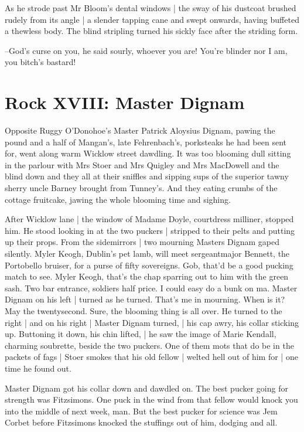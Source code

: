 As he strode past Mr Bloom's dental windows |
the sway of his dustcoat brushed rudely from its angle |
a slender tapping cane and swept onwards,
having buffeted a thewless body.
The blind stripling turned his sickly face after the striding form.

--God's curse on you,
he said sourly,
whoever you are!
You're blinder nor I am,
you bitch's bastard!


\section*{Rock XVIII: Master Dignam}


Opposite Ruggy O'Donohoe's
Master Patrick Aloysius Dignam,
pawing the pound and a half of Mangan's,
late Fehrenbach's,
porksteaks he
had been sent for,
went along warm Wicklow street dawdling.
It was too
blooming dull sitting in the parlour
with Mrs Stoer and Mrs Quigley and
Mrs MacDowell
and the blind down
and they all at their sniffles
and
sipping sups of the superior tawny sherry
uncle Barney brought from
Tunney's.
And they eating crumbs of the cottage fruitcake,
jawing the
whole blooming time and sighing.

After Wicklow lane |
the window of Madame Doyle, courtdress milliner,
stopped him.
He stood looking in at the two puckers |
stripped to their pelts and putting up their props.
From the sidemirrors |
two mourning Masters Dignam gaped silently.
Myler Keogh, Dublin's pet lamb,
will meet sergeantmajor Bennett, the Portobello bruiser,
for a purse of fifty sovereigns.
Gob, that'd be a good pucking match to see.
Myler Keogh, that's the chap sparring out to him with the green sash.
Two bar entrance, soldiers half price.
I could easy do a bunk on ma.
Master Dignam on his left |
turned as he turned.
That's me in mourning.
When is it?
May the twentysecond.
Sure, the blooming thing is all over.
He turned to the right |
and on his right |
Master Dignam turned, |
his cap awry, his collar sticking up.
Buttoning it down, his chin lifted, |
he saw the image of Marie Kendall, charming soubrette,
beside the two puckers.
One of them mots that do be in the packets of fags |
Stoer smokes that his old fellow |
welted hell out of him for |
one time he found out.

Master Dignam got his collar down and dawdled on.
The best pucker
going for strength was Fitzsimons.
One puck in the wind from that fellow
would knock you into the middle of next week, man.
But the best pucker
for science
was Jem Corbet
before Fitzsimons knocked the stuffings out of
him,
dodging and all.

